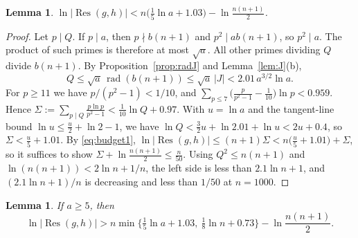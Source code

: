 \documentclass[11pt]{amsart}
\newtheorem{lemma}[theorem]{Lemma}
\theoremstyle{definition}
\theoremstyle{remark}
\numberwithin{equation}{section}
\newcommand{\Res}{\operatorname{Res}}
\newcommand{\rad}{\operatorname{rad}}
\begin{document}
\begin{lemma}\label{lem:up2}
$\ln|\Res(g,h)|<n\bigl(\frac15\ln a+1.03\bigr)-\ln\frac{n(n+1)}2$.
\end{lemma}

\begin{proof}
Let $p\mid Q$. If $p\mid a$, then $p\nmid b(n+1)$ and $p^2\mid ab(n+1)$, so
$p^2\mid a$. The product of such primes is therefore at most $\sqrt a$.
All other primes dividing $Q$ divide $b(n+1)$. By
Proposition~\ref{prop:radJ} and Lemma~\ref{lem:J}(b),
\[
 Q\le\sqrt a\,\rad(b(n+1))\le\sqrt a\,|J|<2.01\,a^{3/2}\ln a .
\]
For $p\ge11$ we have $p/(p^2-1)<1/10$, and
$\sum_{p\le7}\bigl(\frac p{p^2-1}-\frac1{10}\bigr)\ln p<0.959$. Hence
$\Sigma:=\sum_{p\mid Q}\frac{p\ln p}{p^2-1}<\frac1{10}\ln Q+0.97$. With
$u=\ln a$ and the tangent-line bound $\ln u\le\frac u2+\ln2-1$, we have
$\ln Q<\frac32u+\ln2.01+\ln u<2u+0.4$, so $\Sigma<\frac u5+1.01$.
By \eqref{eq:budget1},
$\ln|\Res(g,h)|\le(n+1)\Sigma<n\bigl(\frac u5+1.01\bigr)+\Sigma$, so it suffices to show
$\Sigma+\ln\frac{n(n+1)}2\le\frac n{50}$. Using $Q^2\le n(n+1)$ and
$\ln(n(n+1))<2\ln n+1/n$, the left side is less than $2.1\ln n+1$,
and $(2.1\ln n+1)/n$ is decreasing and less than $1/50$ at $n=1000$.
\end{proof}

\begin{lemma}\label{lem:comp-large}
If $a\ge5$, then
\[
 \ln|\Res(g,h)|>n\min\bigl\{\tfrac15\ln a+1.03,\ \tfrac18\ln n+0.73\bigr\}-\ln\frac{n(n+1)}2 .
\]
\end{lemma}
\end{document}
